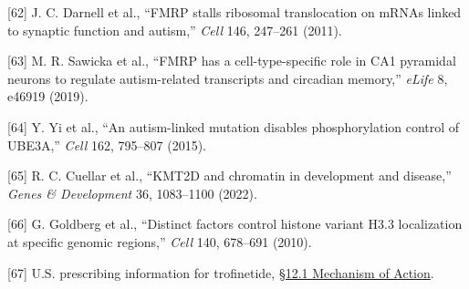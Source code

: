 \documentclass[
]{article}
\begin{document}
{[}62{]} J. C. Darnell et al., ``FMRP stalls ribosomal translocation on
mRNAs linked to synaptic function and autism,'' \emph{Cell} 146,
247--261 (2011).

{[}63{]} M. R. Sawicka et al., ``FMRP has a cell-type-specific role in
CA1 pyramidal neurons to regulate autism-related transcripts and
circadian memory,'' \emph{eLife} 8, e46919 (2019).

{[}64{]} Y. Yi et al., ``An autism-linked mutation disables
phosphorylation control of UBE3A,'' \emph{Cell} 162, 795--807 (2015).

{[}65{]} R. C. Cuellar et al., ``KMT2D and chromatin in development and
disease,'' \emph{Genes \& Development} 36, 1083--1100 (2022).

{[}66{]} G. Goldberg et al., ``Distinct factors control histone variant
H3.3 localization at specific genomic regions,'' \emph{Cell} 140,
678--691 (2010).

{[}67{]} U.S. prescribing information for trofinetide,
\href{https://dailymed.nlm.nih.gov/dailymed/fda/fdaDrugXsl.cfm?setid=67e6f2d9-21f6-466f-9def-826c6a4b8257}{§12.1
Mechanism of Action}.
\end{document}
